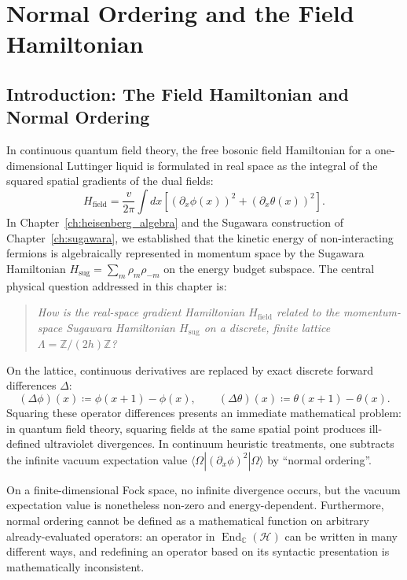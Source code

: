 \chapter{Normal Ordering and the Field Hamiltonian}
\label{ch:field_hamiltonian}

\section{Introduction: The Field Hamiltonian and Normal Ordering}

In continuous quantum field theory, the free bosonic field Hamiltonian for a one-dimensional Luttinger liquid is formulated in real space as the integral of the squared spatial gradients of the dual fields:
\begin{equation}
H_{\mathrm{field}} = \frac{v}{2\pi} \int dx \left[ (\partial_x \phi(x))^2 + (\partial_x \theta(x))^2 \right].
\end{equation}
In Chapter~\ref{ch:heisenberg_algebra} and the Sugawara construction of Chapter~\ref{ch:sugawara}, we established that the kinetic energy of non-interacting fermions is algebraically represented in momentum space by the Sugawara Hamiltonian $H_{\mathrm{sug}} = \sum_{m} \rho_m \rho_{-m}$ on the energy budget subspace. The central physical question addressed in this chapter is:
\begin{quote}
\emph{How is the real-space gradient Hamiltonian $H_{\mathrm{field}}$ related to the momentum-space Sugawara Hamiltonian $H_{\mathrm{sug}}$ on a discrete, finite lattice $\Lambda = \mathbb{Z}/(2h)\mathbb{Z}$?}
\end{quote}

On the lattice, continuous derivatives are replaced by exact discrete forward differences $\Delta$:
\begin{equation}
(\Delta \phi)(x) \coloneqq \phi(x+1) - \phi(x), \qquad (\Delta \theta)(x) \coloneqq \theta(x+1) - \theta(x).
\end{equation}
Squaring these operator differences presents an immediate mathematical problem: in quantum field theory, squaring fields at the same spatial point produces ill-defined ultraviolet divergences. In continuum heuristic treatments, one subtracts the infinite vacuum expectation value $\langle \Omega | (\partial_x \phi)^2 | \Omega \rangle$ by ``normal ordering''.

On a finite-dimensional Fock space, no infinite divergence occurs, but the vacuum expectation value is nonetheless non-zero and energy-dependent. Furthermore, normal ordering cannot be defined as a mathematical function on arbitrary already-evaluated operators: an operator in $\operatorname{End}_{\mathbb{C}}(\mathcal{H})$ can be written in many different ways, and redefining an operator based on its syntactic presentation is mathematically inconsistent.

